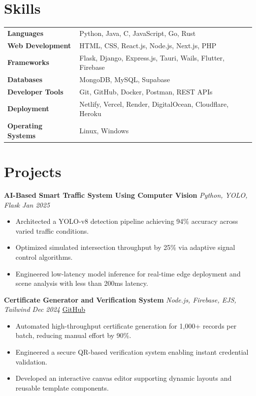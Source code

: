 \documentclass[10pt, a4paper]{article}
\begin{document}
\section*{Skills}

\renewcommand{\arraystretch}{1.0}
\begin{tabular}{@{} >{\bfseries}p{3.8cm} p{13cm} @{}}
Languages           & Python, Java, C, JavaScript, Go, Rust \\
Web Development     & HTML, CSS, React.js, Node.js, Next.js, PHP \\
Frameworks          & Flask, Django, Express.js, Tauri, Wails, Flutter, Firebase \\
Databases           & MongoDB, MySQL, Supabase \\
Developer Tools     & Git, GitHub, Docker, Postman, REST APIs \\
Deployment          & Netlify, Vercel, Render, DigitalOcean, Cloudflare, Heroku \\
Operating Systems   & Linux, Windows \\
\end{tabular}

\section*{Projects}

\textbf{AI-Based Smart Traffic System Using Computer Vision} \hfill \textit{Python, YOLO, Flask \quad Jan 2025}
\begin{itemize}
\item Architected a YOLO-v8 detection pipeline achieving 94\% accuracy across varied traffic conditions.
\item Optimized simulated intersection throughput by 25\% via adaptive signal control algorithms.
\item Engineered low-latency model inference for real-time edge deployment and scene analysis with less than 200ms latency.
\end{itemize}

\vspace{1.5pt}

\textbf{Certificate Generator and Verification System} \hfill \textit{Node.js, Firebase, EJS, Tailwind \quad Dec 2024} \quad \href{https://github.com/bbinxx/advanced-certificate-generator}{GitHub}
\begin{itemize}
\item Automated high-throughput certificate generation for 1,000+ records per batch, reducing manual effort by 90\%.
\item Engineered a secure QR-based verification system enabling instant credential validation.
\item Developed an interactive canvas editor supporting dynamic layouts and reusable template components.
\end{itemize}
\end{document}
